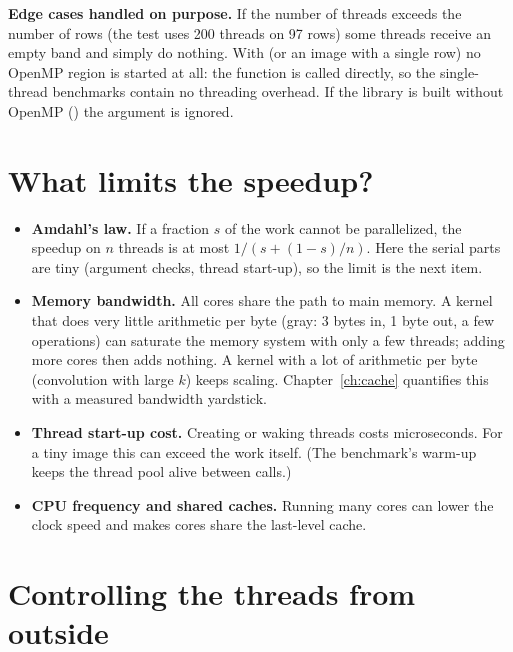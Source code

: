 \begin{plain}
\textbf{Edge cases handled on purpose.} If the number of threads exceeds the number of rows (the test uses 200 threads on 97 rows) some threads receive an empty band and simply do nothing. With  (or an image with a single row) no OpenMP region is started at all: the function is called directly, so the single-thread benchmarks contain no threading overhead. If the library is built without OpenMP () the  argument is ignored.
\end{plain}

\section{What limits the speedup?}

\begin{itemize}
\item \textbf{Amdahl's law.} If a fraction $s$ of the work cannot be parallelized, the speedup on $n$ threads is at most $1/(s+(1-s)/n)$. Here the serial parts are tiny (argument checks, thread start-up), so the limit is the next item.
\item \textbf{Memory bandwidth.} All cores share the path to main memory. A kernel that does very little arithmetic per byte (gray: 3 bytes in, 1 byte out, a few operations) can saturate the memory system with only a few threads; adding more cores then adds nothing. A kernel with a lot of arithmetic per byte (convolution with large $k$) keeps scaling. Chapter~\ref{ch:cache} quantifies this with a measured bandwidth yardstick.
\item \textbf{Thread start-up cost.} Creating or waking threads costs microseconds. For a tiny image this can exceed the work itself. (The benchmark's warm-up keeps the thread pool alive between calls.)
\item \textbf{CPU frequency and shared caches.} Running many cores can lower the clock speed and makes cores share the last-level cache.
\end{itemize}

\section{Controlling the threads from outside}

